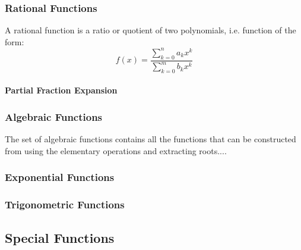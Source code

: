 
\subsubsection{Rational Functions}
A rational function is a ratio or quotient of two polynomials, i.e. function of the form:
\begin{equation}
 f(x) = \frac{\sum_{k=0}^n a_k x^k}{\sum_{k=0}^m b_k x^k}
\end{equation}

\paragraph{Partial Fraction Expansion}



\subsubsection{Algebraic Functions}
The set of algebraic functions contains all the functions that can be constructed from using the elementary operations and extracting roots....

\subsubsection{Exponential Functions}

\subsubsection{Trigonometric Functions}



\subsection{Special Functions}


